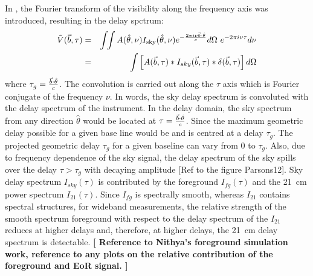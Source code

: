 \documentclass[12pt,preprint]{aastex}
\newcommand{\sky}{{\rm sky}}
\newcommand{\bm}{{A}}
\newcommand{\thhat}{{\hat\theta}}
\newcommand{\ifngexp}{{e^{-\frac{2\pi i\nu\vec{b}\cdot\thhat}{c}}}}
\begin{document}
In \citet{parsons_et_al2012a}, the Fourier transform of the visibility along the frequency axis was introduced,
resulting in the delay spctrum:
\begin{eqnarray}
\tilde V(\vec b, \tau) & = & \int\!\!\int{\bm(\thhat,\nu) I_\sky(\thhat,\nu) \ifngexp d\Omega~e^{-2\pi i\nu\tau}d\nu}\nonumber\\	                        & = &   \int \left [ A(\vec b, \tau)\ast I_{sky}(\vec b, \tau) \ast \delta( \vec b, \tau )\right ] d\Omega 
\label{eq3}
\end{eqnarray}
where $\tau_{g} = {\vec b \cdot \thhat \over c}$. The convolution is carried out along the $\tau$ axis which is Fourier conjugate of the frequency $\nu$. In words, the sky delay spectrum is convoluted with the delay spectrum of the instrument. In the delay domain, the sky spectrum from any direction $\thhat$ would be located at $\tau = {\vec b \cdot \thhat \over c}$. Since the maximum geometric delay possible for a given base line would be    and is centred at a delay $\tau_{g}$. The projected geometric delay $\tau_{g}$ for a given baseline can vary from 0 to $\tau_{g}$. Also, due to frequency dependence of the sky signal, the delay spectrum of the sky spills over the delay $\tau> \tau_{g}$ with decaying amplitude [Ref to the figure Parsons12]. Sky delay spectrum $I_{sky}(\tau)$ is contributed by the foreground  $I_{fg}(\tau)$ and the 21~cm power spectrum $I_{21}(\tau)$. Since $I_{fg}$ is spectrally smooth, whereas $I_{21}$ contains spectral structures, for wideband measurements, the relative strength of the smooth spectrum foreground with respect to the delay spectrum of the $I_{21}$ reduces at higher delays and, therefore, at higher delays, the 21~cm delay spectrum is detectable.  \textbf{[ Reference to Nithya's foreground simulation work, reference to any plots on the relative contribution of the  foreground and EoR signal. ]}
\end{document}
